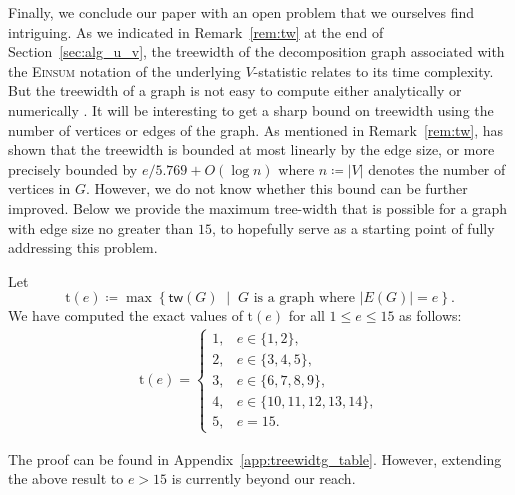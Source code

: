 \documentclass[letterpaper,11pt]{article}
\def\Einsum{\textsc{Einsum}}
\newcommand{\libref}[2]{\href{#2}{\texttt{#1}}}
\newcommand{\treewidthp}[1]{\mathsf{tw}(#1)}
\def\package{\libref{u-stats}{https://github.com/zrq1706/U-Statistics-Python}}
\begin{document}
\begin{bibunit}[plainnat]
Finally, we conclude our paper with an open problem that we ourselves find intriguing. As we indicated in Remark~\ref{rem:tw} at the end of Section~\ref{sec:alg_u_v}, the treewidth of the decomposition graph associated with the \Einsum{} notation of the underlying $V$-statistic relates to its time complexity. But the treewidth of a graph is not easy to compute either analytically \citep{harvey2018treewidth} or numerically \citep{arnborg1987complexity}. It will be interesting to get a sharp bound on treewidth using the number of vertices or edges of the graph. As mentioned in Remark~\ref{rem:tw}, \citet{kneis2009bound} has shown that the treewidth is bounded at most linearly by the edge size, or more precisely bounded by $e / 5.769 + O (\log n)$ where $n \coloneqq |V|$ denotes the number of vertices in $G$. However, we do not know whether this bound can be further improved. Below we provide the maximum tree-width that is possible for a graph with edge size no greater than $15$, to hopefully serve as a starting point of fully addressing this problem.
\begin{observation}
\label{pro:treewidth_table}
Let
\begin{equation*}
\mathrm{t}(e) \coloneqq \max \left\{ \treewidthp{G} \;\middle|\; G \text{ is a graph where } |E(G)| = e \right\}.
\end{equation*}
We have computed the exact values of $\mathrm{t} (e)$ for all $1 \le e \le 15$ as follows:
\begin{equation*}
\begin{split}
\mathrm{t} (e) = \left\{ \begin{array}{ll}
1, & e \in \{1, 2\}, \\
2, & e \in \{3, 4, 5\}, \\
3, & e \in \{6, 7, 8, 9\}, \\
4, & e \in \{10, 11, 12, 13, 14\}, \\
5, & e = 15.
\end{array} \right.
\end{split}
\end{equation*}
\end{observation}
\noindent The proof can be found in Appendix~\ref{app:treewidtg_table}. However, extending the above result to $e > 15$ is currently beyond our reach.




\putbib[\myreferences]
\end{bibunit}
\appendix
\end{document}
